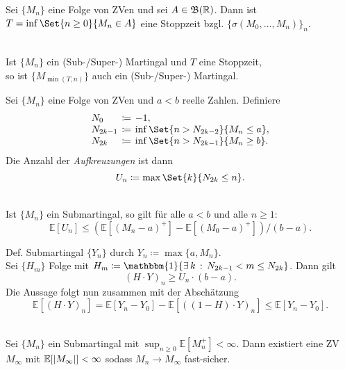 \documentclass{cheat-sheet}
\newcommand{\E}{\mathbb{E}} %
\newcommand{\ind}{\mathbbm{1}} %
\newcommand{\Bor}{\mathfrak{B}} %
\begin{document}
\begin{bsp}
  Sei $\{ M_n \}$ eine Folge von ZVen und sei $A \in \Bor(\R)$.
  Dann ist $T = \inf \Set{n \geq 0}{M_n \in A}$ eine Stoppzeit bzgl. $\{ \sigma(M_0, \ldots, M_n) \}_n$.
\end{bsp}

\begin{satz} \mbox{} \\
  Ist $\{ M_n \}$ ein (Sub-/Super-) Martingal und $T$ eine Stoppzeit, \\
  so ist $\{ M_{\min(T, n)} \}$ auch ein (Sub-/Super-) Martingal.
\end{satz}



Sei $\{ M_n \}$ eine Folge von ZVen und $a < b$ reelle Zahlen.
Definiere
\[
  \arraycolsep=2pt
  \begin{array}{l c l}
    N_0 &\coloneqq& -1, \\
    N_{2k-1} &\coloneqq& \inf \Set{n > N_{2k-2}}{M_n \leq a}, \\
    N_{2k} &\coloneqq& \inf \Set{n > N_{2k-1}}{M_n \geq b}.
  \end{array}
\]
Die Anzahl der \textit{Aufkreuzungen} ist dann
\[
  U_n \coloneqq \max \Set{k}{N_{2k} \leq n}.
\]

\begin{satz} \mbox{}\\
  Ist $\{ M_n \}$ ein Submartingal, so gilt für alle $a < b$ und alle $n \geq 1$:
  \[ \E[ U_n ] \leq (\E[ (M_n - a)^{+} ] - \E[ (M_0 - a)^{+} ]) / (b - a). \]
\end{satz}

\begin{beweisskizze}
  Def. Submartingal $\{ Y_n \}$ durch $Y_n \coloneqq \max \{ a, M_n \}$. \\
  Sei $\{ H_m \}$ Folge mit $H_m \coloneqq \ind \{ \ex{k} N_{2k-1} < m \leq N_{2k} \}$.
  Dann gilt
  \[ (H \cdot Y)_n \geq U_n \cdot (b - a). \]
  Die Aussage folgt nun zusammen mit der Abschätzung
  \[ \E[(H \cdot Y)_n] = \E[Y_n - Y_0] - \E[((1-H) \cdot Y)_n] \leq \E[Y_n - Y_0]. \]
\end{beweisskizze}

\begin{satz} \mbox{}\\
  Sei $\{ M_n \}$ ein Submartingal mit ${\sup}_{n \geq 0} \E [ M_n^{+} ] < \infty$.
  Dann existiert eine ZV $M_\infty$ mit $\E[ \abs{M_\infty} ] < \infty$ sodass $M_n \to M_\infty$ fast-sicher.
\end{satz}
\end{document}
